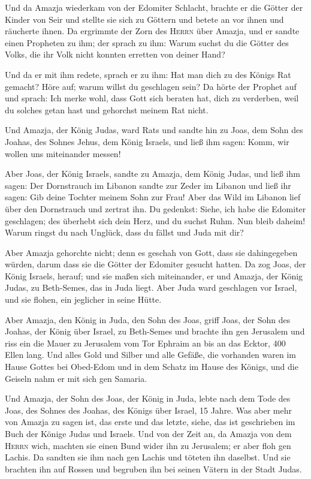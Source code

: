  Und da Amazja wiederkam von der Edomiter Schlacht,
brachte er die Götter der Kinder von Seir und stellte sie sich zu
Göttern und betete an vor ihnen und räucherte ihnen.  Da
ergrimmte der Zorn des \textsc{Herrn} über Amazja, und er sandte einen
Propheten zu ihm; der sprach zu ihm: Warum suchst du die Götter des
Volks, die ihr Volk nicht konnten erretten von deiner Hand?

 Und da er mit ihm redete, sprach er zu ihm: Hat man dich
zu des Königs Rat gemacht? Höre auf; warum willst du geschlagen sein? Da
hörte der Prophet auf und sprach: Ich merke wohl, dass Gott sich beraten
hat, dich zu verderben, weil du solches getan hast und gehorchst meinem
Rat nicht.

 Und Amazja, der König Judas, ward Rats und sandte hin zu
Joas, dem Sohn des Joahas, des Sohnes Jehus, dem König Israels, und ließ
ihm sagen: Komm, wir wollen uns miteinander messen!

 Aber Joas, der König Israels, sandte zu Amazja, dem
König Judas, und ließ ihm sagen: Der Dornstrauch im Libanon sandte zur
Zeder im Libanon und ließ ihr sagen: Gib deine Tochter meinem Sohn zur
Frau! Aber das Wild im Libanon lief über den Dornstrauch und zertrat
ihn.  Du gedenkst: Siehe, ich habe die Edomiter
geschlagen; des überhebt sich dein Herz, und du suchst Ruhm. Nun bleib
daheim! Warum ringst du nach Unglück, dass du fällst und Juda mit dir?

 Aber Amazja gehorchte nicht; denn es geschah von Gott,
dass sie dahingegeben würden, darum dass sie die Götter der Edomiter
gesucht hatten.  Da zog Joas, der König Israels, herauf;
und sie maßen sich miteinander, er und Amazja, der König Judas, zu
Beth-Semes, das in Juda liegt.  Aber Juda ward geschlagen
vor Israel, und sie flohen, ein jeglicher in seine Hütte.

 Aber Amazja, den König in Juda, den Sohn des Joas, griff
Joas, der Sohn des Joahas, der König über Israel, zu Beth-Semes und
brachte ihn gen Jerusalem und riss ein die Mauer zu Jerusalem vom Tor
Ephraim an bis an das Ecktor, 400 Ellen lang.  Und alles
Gold und Silber und alle Gefäße, die vorhanden waren im Hause Gottes bei
Obed-Edom und in dem Schatz im Hause des Königs, und die Geiseln nahm er
mit sich gen Samaria.

 Und Amazja, der Sohn des Joas, der König in Juda, lebte
nach dem Tode des Joas, des Sohnes des Joahas, des Königs über Israel,
15 Jahre.  Was aber mehr von Amazja zu sagen ist, das
erste und das letzte, siehe, das ist geschrieben im Buch der Könige
Judas und Israels.  Und von der Zeit an, da Amazja von
dem \textsc{Herrn} wich, machten sie einen Bund wider ihn zu Jerusalem;
er aber floh gen Lachis. Da sandten sie ihm nach gen Lachis und töteten
ihn daselbst.  Und sie brachten ihn auf Rossen und
begruben ihn bei seinen Vätern in der Stadt Judas.


